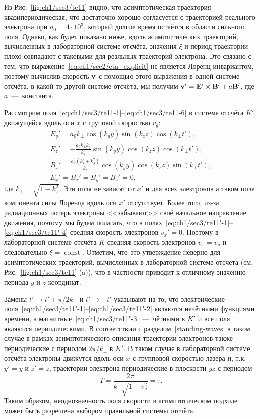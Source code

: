Из Рис.~\ref{fig:ch1/sec3/te11} видно, что асимптотическая траектория квазипериодическая, что достаточно хорошо согласуется с траекторией реального электрона при $a_0= 4 \cdot 10^3$, который долгое время остаётся в области сильного поля. Однако, как будет показано ниже, вдоль асимптотических траекторий, вычисленных в лабораторной системе отсчёта, значения $\xi$ и период траектории плохо совпадают с таковыми для реальных траекторий электрона. Это связано с тем, что выражение~\eqref{eq:ch1/sec2/eta_explicit} не является Лоренц-инвариантом, поэтому вычислив скорость $\vb v$ с помощью этого выражения в одной системе отсчёта, в какой-то другой системе отсчёта, мы получим ${\vb v}' = \vb{E}' \times \vb{B}' + a \vb{B}'$, где $a$~---~константа.

Рассмотрим поля~\eqref{eq:ch1/sec3/te11-1}--\eqref{eq:ch1/sec3/te11-6} в системе отсчёта $K'$, движущейся вдоль оси $x$ с груповой скоростью $v_g$:
\begin{eqnarray}
    \label{eq:ch1/sec3/te11'-1}
    E_y' = a_0 k_\perp \cos(k_y y) \sin(k_z z) \cos(k_\perp t'), \\
    \label{eq:ch1/sec3/te11'-2}
    E_z' = -\frac{a_0 k_\perp k_y}{k_z} \sin(k_y y) \cos(k_z z) \cos(k_\perp t'), \\
    \label{eq:ch1/sec3/te11'-3}
    B_x' = \frac{a_0 (k_z^2 + k_y^2)}{k_z} \cos(k_y y) \cos(k_z z) \sin(k_\perp t'), \\
    \label{eq:ch1/sec3/te11'-4}
    E_x' = B_x' = B_y' = B_z' = 0,
\end{eqnarray}
где $k_\perp = \sqrt{1 - k_x^2}$. Эти поля не зависят от $x'$ и для всех электронов а таком поле компонента силы Лоренца вдоль оси $x'$ отсутствует. Более того, из-за радиационных потерь электроны <<забывают>> своё начальное направление движения, поэтому мы будем полагать, что в полях~\eqref{eq:ch1/sec3/te11'-1}--\eqref{eq:ch1/sec3/te11'-4} средняя скорость электронов $v_x' = 0$. Поэтому в лабораторной системе отсчёта $K$ средняя скорость электронов $v_x = v_g$ и следовательно $\xi = \operatorname{const}$. Отметим, что это утверждение неверно для асимптотических траекторий, вычисленных в лабораторной системе отсчёта (см. Рис.~\ref{fig:ch1/sec3/te11} (a)), что в частности приводит к отличному значению периода $y$ и $z$ координат.

Замены $t' \rightarrow t' + \pi / 2 k_\perp$ и $t' \rightarrow -t'$ указывают на то, что электрические поля~\eqref{eq:ch1/sec3/te11'-1}--\eqref{eq:ch1/sec3/te11'-2} являются нечётными функциями времени, а магнитные~\eqref{eq:ch1/sec3/te11'-3}~---~чётными в $K'$ и все поля являются периодическими. В соответствии с разделом~\ref{standing-waves} в таком случае в рамках асимптотического описания траектории электронов также периодические с периодом $2 \pi / k_\perp$ в $K'$. В таком случае в лабораторной системе отсчёта электроны движутся вдоль оси $x$ с групповой скоростью лазера и, т.к. $y' = y$ и $z' = z$, траектории электрона периодические в плоскости $yz$ с периодом
\begin{equation}
    T = \frac{2 \pi}{k_\perp \sqrt{1 - v_g^2}} = \tau.
\end{equation}
Таким образом, неоднозначность поля скорости в асимптотическом подходе может быть разрешена выбором правильной системы отсчёта.

